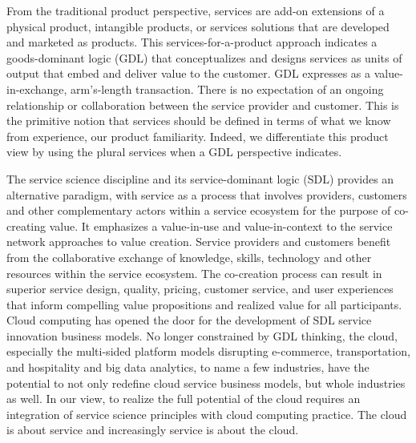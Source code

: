 From the traditional product perspective, services are add-on extensions of a physical product, intangible products, or services solutions that are developed and marketed as products. This services-for-a-product approach indicates a goods-dominant logic (GDL) that conceptualizes and designs services as units of output that embed and deliver value to the customer. GDL expresses as a value-in-exchange, arm's-length transaction. There is no expectation of an ongoing relationship or collaboration between the service provider and customer. This is the primitive notion that services should be defined in terms of what we know from experience, our product familiarity. Indeed, we differentiate this product view by using the plural services when a GDL perspective indicates.
\newline

The service science discipline and its service-dominant logic (SDL) provides an alternative paradigm, with service as a process that involves providers, customers and other complementary actors within a service ecosystem for the purpose of co-creating value. It emphasizes a value-in-use and value-in-context to the service network approaches to value creation. Service providers and customers benefit from the collaborative exchange of knowledge, skills, technology and other resources within the service ecosystem. The co-creation process can result in superior service design, quality, pricing, customer service, and user experiences that inform compelling value propositions and realized value for all participants. Cloud computing has opened the door for the development of SDL service innovation business models. No longer constrained by GDL thinking, the cloud, especially the multi-sided platform models disrupting e-commerce, transportation, and hospitality and big data analytics, to name a few industries, have the potential to not only redefine cloud service business models, but whole industries as well. In our view, to realize the full potential of the cloud requires an integration of service science principles with cloud computing practice. The cloud is about service and increasingly service is about the cloud.
\newline


